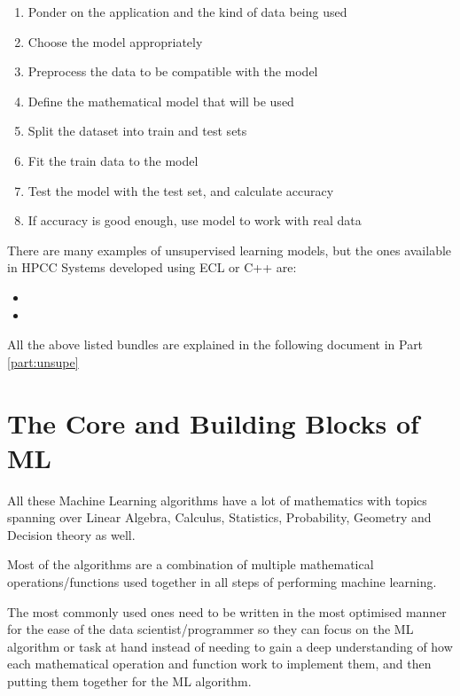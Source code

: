 \begin{enumerate}
    \item Ponder on the application and the kind of data being used
    \item Choose the model appropriately
    \item Preprocess the data to be compatible with the model
    \item Define the mathematical model that will be used
    \item Split the dataset into train and test sets
    \item Fit the train data to the model
    \item Test the model with the test set, and calculate accuracy
    \item If accuracy is good enough, use model to work with real data
\end{enumerate}

There are many examples of unsupervised learning models, but the ones available in HPCC Systems developed using ECL or C++ are:

\begin{itemize}
    \item {}
    \item {}
\end{itemize}

All the above listed bundles are explained in the following document in Part \ref{part:unsupe}

\chapter{The Core and Building Blocks of ML}\label{chap:coreml}

All these Machine Learning algorithms have a lot of mathematics with topics spanning over Linear Algebra, Calculus, Statistics, Probability, Geometry and Decision theory as well. 

Most of the algorithms are a combination of multiple mathematical operations/functions used together in all steps of performing machine learning. 

The most commonly used ones need to be written in the most optimised manner for the ease of the data scientist/programmer so they can focus on the ML algorithm or task at hand instead of needing to gain a deep understanding of how each mathematical operation and function work to implement them, and then putting them together for the ML algorithm.

